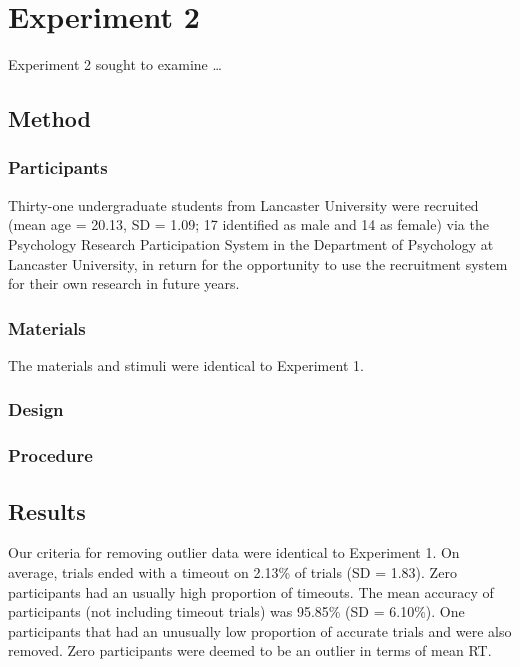 \documentclass[
  man]{apa6}
\begin{document}
\hypertarget{experiment-2}{%
\section{Experiment 2}\label{experiment-2}}

Experiment 2 sought to examine \ldots{}

\hypertarget{method-1}{%
\subsection{Method}\label{method-1}}

\hypertarget{participants-1}{%
\subsubsection{Participants}\label{participants-1}}

Thirty-one undergraduate students from Lancaster University were recruited (mean age = 20.13, SD = 1.09; 17 identified as male and 14 as female) via the Psychology Research Participation System in the Department of Psychology at Lancaster University, in return for the opportunity to use the recruitment system for their own research in future years.

\hypertarget{materials-1}{%
\subsubsection{Materials}\label{materials-1}}

The materials and stimuli were identical to Experiment 1.

\hypertarget{design-1}{%
\subsubsection{Design}\label{design-1}}

\hypertarget{procedure-1}{%
\subsubsection{Procedure}\label{procedure-1}}

\hypertarget{results-1}{%
\subsection{Results}\label{results-1}}

Our criteria for removing outlier data were identical to Experiment 1. On average, trials ended with a timeout on 2.13\% of trials (SD = 1.83). Zero participants had an usually high proportion of timeouts. The mean accuracy of participants (not including timeout trials) was 95.85\% (SD = 6.10\%). One participants that had an unusually low proportion of accurate trials and were also removed. Zero participants were deemed to be an outlier in terms of mean RT.
\end{document}
